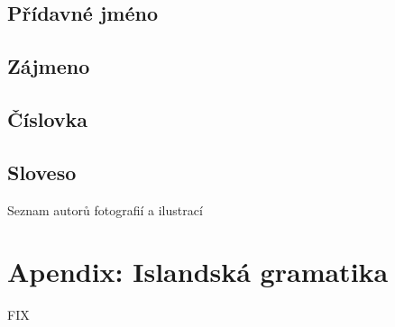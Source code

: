 \section{Přídavné jméno}                         \label{sec:morpho_adj}
{\small{}}


\section{Zájmeno}                                \label{sec:morpho_pron}


\section{Číslovka}                               \label{sec:morpho_num}
{\small{}}

\section{Sloveso}                                \label{sec:morpho_v}



\twocolumn
\pagestyle{empty}

\cleardoublepage
{}
{}
  {Seznam autorů fotografií a ilustrací}         \label{sec:photo}
\printindex

\cleardoublepage
{}
{}
\nocite{*}
\printbibliography

\onecolumn
\pagestyle{empty}

\chapter{Apendix: Islandská gramatika}
%

FIX

\cleardoublepage\null\clearpage %


\cleardoublepage\null\clearpage %
\makecover\backcoverimages


